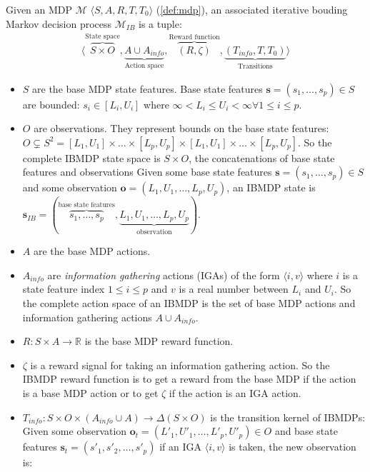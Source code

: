 \begin{definition}\label{def:ibmdp}
Given an MDP $\mathcal{M}$ $\langle S, A, R, T, T_0 \rangle$ (\ref{def:mdp}), an associated iterative bouding Markov decision process $\mathcal{M}_{IB}$ is a tuple:
\begin{align*}
    \langle \overbrace{S \times O}^{\text{State space}}, \underbrace{A \cup A_{info}}_{\text{Action space}}, \overbrace{(R, \zeta)}^{\text{Reward function}}, \underbrace{(T_{info}, T, T_0)}_{\text{Transitions}}\rangle
\end{align*}

\begin{itemize}
\item $S$ are the base MDP state features. Base state features $\boldsymbol{s} = (s_1, \dots, s_p)\in S$ are bounded: $s_i \in [L_i, U_i]$ where $\infty < L_i \leq U_i < \infty \forall 1\leq i \leq p$.
\item $O$ are observations. They represent bounds on the base state features: $O\subsetneq S^2 =  [L_1, U_1]\times \dots \times [L_p, U_p] \times [L_1, U_1]\times \dots \times [L_p, U_p]$. So the complete IBMDP state space is $S \times O$, the concatenations of base state features and observations
Given some base state features $\boldsymbol{s} = (s_1, \dots, s_p)\in S$ and some observation $\boldsymbol{o} = (L_1, U_1, \dots, L_p, U_p)$, an IBMDP state is $\boldsymbol{s}_{IB} = (\overbrace{s_1, \dots, s_p}^{\text{base state features}}, \underbrace{L_1, U_1, \dots, L_p, U_p}_{\text{observation}})$.
\item $A$ are the base MDP actions.
\item $A_{info}$ are \textit{information gathering} actions (IGAs) of the form $\langle i, v \rangle$ where $i$ is a state feature index $1 \leq i \leq p$ and $v$ is a real number between $L_i$ and $U_i$. So the complete action space of an IBMDP is the set of base MDP actions and information gathering actions $A \cup A_{info}$.
\item $R: S\times A \rightarrow \mathbb{R}$ is the base MDP reward function.
\item $\zeta$ is a reward signal for taking an information gathering action.
So the IBMDP reward function is to get a reward from the base MDP if the action is a base MDP action or to get $\zeta$ if the action is an IGA action.
\item $T_{info}: S\times O \times( A_{info} \cup A )\rightarrow \Delta (S\times O)$ is the transition kernel of IBMDPs: 
Given some observation $\boldsymbol{o}_t = (L'_1, U'_1, \dots, L'_p, U'_p) \in O$ and base state features $\boldsymbol{s}_t=(s'_1, s'_2, \dots, s'_p)$ if an IGA $\langle i, v \rangle$ is taken, the new observation is:

\end{itemize}
\end{definition}
